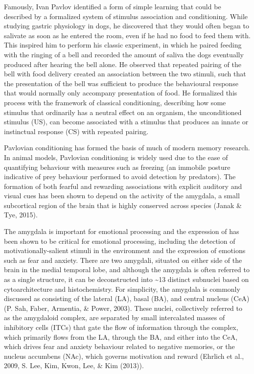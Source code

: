 \documentclass[12pt,a4paperpaper,]{report}
\begin{document}
Famously, Ivan Pavlov identified a form of simple learning that could be
described by a formalized system of stimulus association and
conditioning. While studying gastric physiology in dogs, he discovered
that they would often began to salivate as soon as he entered the room,
even if he had no food to feed them with. This inspired him to perform
his classic experiment, in which he paired feeding with the ringing of a
bell and recorded the amount of saliva the dogs eventually produced
after hearing the bell alone. He observed that repeated pairing of the
bell with food delivery created an association between the two stimuli,
such that the presentation of the bell was sufficient to produce the
behavioural response that would normally only accompany presentation of
food. He formalized this process with the framework of classical
conditioning, describing how some stimulus that ordinarily has a neutral
effect on an organism, the unconditioned stimulus (US), can become
associated with a stimulus that produces an innate or instinctual
response (CS) with repeated pairing.

Pavlovian conditioning has formed the basis of much of modern memory
research. In animal models, Pavlovian conditioning is widely used due to
the ease of quantifying behaviour with measures such as freezing (an
immobile posture indicative of prey behaviour performed to avoid
detection by predators). The formation of both fearful and rewarding
associations with explicit auditory and visual cues has been shown to
depend on the activity of the amygdala, a small subcortical region of
the brain that is highly conserved across species (Janak \& Tye, 2015).

The amygdala is important for emotional processing and the expression of
has been shown to be critical for emotional processing, including the
detection of motivationally-salient stimuli in the environment and the
expression of emotions such as fear and anxiety. There are two amygdali,
situated on either side of the brain in the medial temporal lobe, and
although the amygdala is often referred to as a single structure, it can
be deconstructed into \textasciitilde{}13 distinct subnuclei based on
cytoarchitecture and histochemistry. For simplicity, the amygdala is
commonly discussed as consisting of the lateral (LA), basal (BA), and
central nucleus (CeA) (P. Sah, Faber, Armentia, \& Power, 2003). These
nuclei, collectively referred to as the amygdaloid complex, are
separated by small intercalated masses of inhibitory cells (ITCs) that
gate the flow of information through the complex, which primarily flows
from the LA, through the BA, and either into the CeA, which drives fear
and anxiety behaviour related to negative memories, or the nucleus
accumbens (NAc), which governs motivation and reward (Ehrlich et al.,
2009, S. Lee, Kim, Kwon, Lee, \& Kim (2013)).
\end{document}
